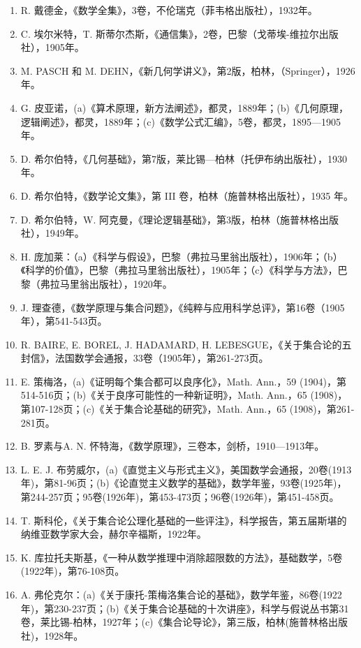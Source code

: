 \begin{enumerate}
\def\labelenumi{\arabic{enumi}.}
\setcounter{enumi}{25}
\item
  R. 戴德金，《数学全集》，3卷，不伦瑞克（菲韦格出版社），1932年。
\item
  C. 埃尔米特，T. 斯蒂尔杰斯，《通信集》，2卷，巴黎（戈蒂埃-维拉尔出版社），1905年。
\item
  M. PASCH 和 M. DEHN，《新几何学讲义》，第2版，柏林，（Springer），1926年。
\item
  G. 皮亚诺，(a)《算术原理，新方法阐述》，都灵，1889年；(b)《几何原理，逻辑阐述》，都灵，1889年；(c)《数学公式汇编》，5卷，都灵，1895—1905年。
\item
  D. 希尔伯特，《几何基础》，第7版，莱比锡—柏林（托伊布纳出版社），1930年。
\item
  D. 希尔伯特，《数学论文集》，第 III 卷，柏林（施普林格出版社），1935 年。
\item
  D. 希尔伯特，W. 阿克曼，《理论逻辑基础》，第3版，柏林（施普林格出版社），1949年。
\item
  H. 庞加莱：（a）《科学与假设》，巴黎（弗拉马里翁出版社），1906年；（b）《科学的价值》，巴黎（弗拉马里翁出版社），1905年；（c）《科学与方法》，巴黎（弗拉马里翁出版社），1920年。
\item
  J. 理查德，《数学原理与集合问题》，《纯粹与应用科学总评》，第16卷（1905年），第541-543页。
\item
  R. BAIRE, E. BOREL, J. HADAMARD, H. LEBESGUE，《关于集合论的五封信》，法国数学会通报，33卷（1905年），第261-273页。
\item
  E. 策梅洛，(a)《证明每个集合都可以良序化》，Math. Ann.，59 (1904)，第514-516页；(b)《关于良序可能性的一种新证明》，Math. Ann.，65 (1908)，第107-128页；(c)《关于集合论基础的研究》，Math. Ann.，65 (1908)，第261-281页。
\item
  B. 罗素与A. N. 怀特海，《数学原理》，三卷本，剑桥，1910—1913年。
\item
  L. E. J. 布劳威尔，(a)《直觉主义与形式主义》，美国数学会通报，20卷(1913年)，第81-96页；(b)《论直觉主义数学的基础》，数学年鉴，93卷(1925年)，第244-257页；95卷(1926年)，第453-473页；96卷(1926年)，第451-458页。
\item
  T. 斯科伦，《关于集合论公理化基础的一些评注》，科学报告，第五届斯堪的纳维亚数学家大会，赫尔辛福斯，1922年。
\item
  K. 库拉托夫斯基，《一种从数学推理中消除超限数的方法》，基础数学，5卷(1922年)，第76-108页。
\item
  A. 弗伦克尔：(a)《关于康托-策梅洛集合论的基础》，数学年鉴，86卷(1922年)，第230-237页；(b)《关于集合论基础的十次讲座》，科学与假说丛书第31卷，莱比锡-柏林，1927年；(c)《集合论导论》，第三版，柏林(施普林格出版社)，1928年。

\end{enumerate}
